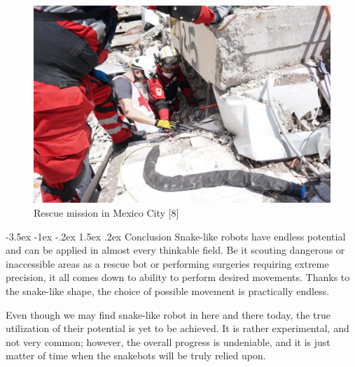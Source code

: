 \documentclass[a4paper,10pt]{article}
\makeatletter
\theoremstyle{definition}
\renewcommand\section{\@startsection {section}{1}{\z@}%
                                   {-3.5ex \@plus -1ex \@minus -.2ex}%
                                   {1.5ex \@plus.2ex}%
                                   {\large\bfseries}}
\makeatother
\begin{document}
\begin{figure}[h]
\begin{center}
\includegraphics[scale=0.75]{image/Rescue_mission_in_Mexico_City.png}
\caption{Rescue mission in Mexico City [8]}
\label{}
\end{center}
\end{figure}

\section{Conclusion}
Snake-like robots have endless potential and can be applied in almost every thinkable 
field. Be it scouting dangerous or inaccessible areas as a rescue bot or performing 
surgeries requiring extreme precision, it all comes down to ability to perform desired 
movements. Thanks to the snake-like shape, the choice of possible movement is 
practically endless.

Even though we may find snake-like robot in here and there today, the true 
utilization of their potential is yet to be achieved. It is rather experimental, and not very 
common; however, the overall progress is undeniable, and it is just matter of time when
the snakebots will be truly relied upon.

\newpage
\end{document}
